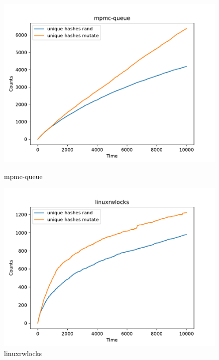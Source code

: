 \begin{figure}[H]
    \vspace{0.5cm}
    
    \begin{minipage}{0.45\textwidth}
        \centering
        \includegraphics[width=\textwidth]{figure/mpmc-queue.pdf}
        \caption{mpmc-queue}
        \label{cover-plot1-mpmc-queue}
    \end{minipage}
    \hfill
    \begin{minipage}{0.45\textwidth}
        \centering
        \includegraphics[width=\textwidth]{figure/linuxrwlocks.pdf}
        \caption{linuxrwlocks}
        \label{cover-plot1-linuxrwlocks}
    \end{minipage}
    

\end{figure}
